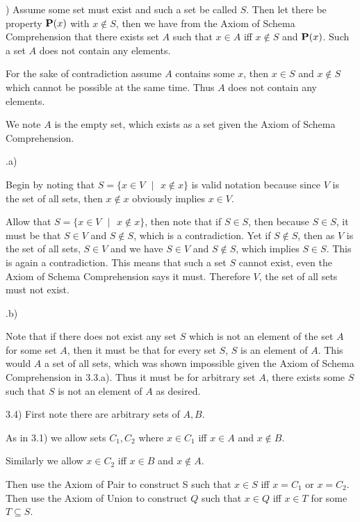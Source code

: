 \documentclass{article}
\begin{document}
)
Assume some set must exist and such a set be called $S$. Then let there be property $\bold{P}(x)$ with $x \notin S$, then we have from the Axiom of Schema Comprehension that there exists set $A$ such that $x \in A$ iff $x \notin S$ and $\bold{P}(x)$. Such a set $A$ does not contain any elements. 

\medskip
For the sake of contradiction assume $A$ contains some $x$, then $x \in S$ and $x \notin S$ which cannot be possible at the same time. Thus $A$ does not contain any elements.

\medskip
We note $A$ is the empty set, which exists as a set given the Axiom of Schema Comprehension.

.a)

Begin by noting that $S = \{x \in V \text{ }|\text{ } x \notin x\}$ is valid notation because since $V$ is the set of all sets, then $x \notin x$ obviously implies $x \in V$.  

\medskip

Allow that $S = \{x \in V \text{ }|\text{ } x \notin x\}$, then note that if $S \in S$, then because $S \in S$, it must be that $S \in V$ and $S \notin S$, which is a contradiction. Yet if $S \notin S$, then as $V$ is the set of all sets, $S \in V$ and we have $S \in V$ and $S \notin S$, which implies $S \in S$. This is again a contradiction. This means that such a set $S$ cannot exist, even the Axiom of Schema Comprehension says it must. Therefore $V$, the set of all sets must not exist.

.b)

Note that if there does not exist any set $S$ which is not an element of the set $A$ for some set $A$, then it must be that for every set $S$, $S$ is an element of $A$. This would $A$ a set of all sets, which was shown impossible given the Axiom of Schema Comprehension in 3.3.a). Thus it must be for arbitrary set $A$, there exists some $S$ such that $S$ is not an element of $A$ as desired.

\newpage

3.4)
First note there are arbitrary sets of $A,B$.

\medskip
As in 3.1) we allow sets $C_1,C_2$ where $x \in C_1$ iff $x \in A$ and $x \notin B$.

\medskip
Similarly we allow $x \in C_2$ iff $x \in B$ and $x \notin A$.

\medskip
Then use the Axiom of Pair to construct S such that $x \in S$ iff $x = C_1$ or $x = C_2$. Then use the Axiom of Union to construct $Q$ such that $x \in Q$ iff $x \in T$ for some $T \subseteq S$. 
\end{document}
